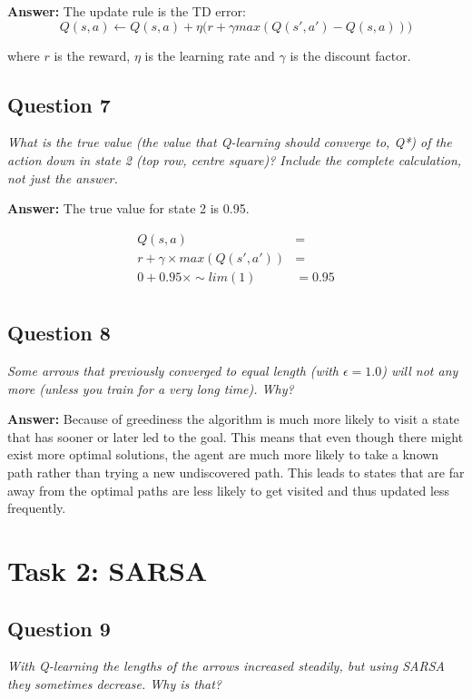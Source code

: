\documentclass[a4paper]{article}
\begin{document}
\textbf{Answer:} 
The update rule is the TD error:
\begin{equation*}
Q(s, a) \leftarrow Q(s, a) + \eta \bigg( r + \gamma max(Q(s', a') - Q(s, a)) \bigg)
\end{equation*}

 where $r$ is the reward, $\eta$ is the learning rate and $\gamma$ is the discount factor.

\subsection*{Question 7}
\emph{What is the true value (the value that Q-learning should converge
to, Q*) of the action down in state 2 (top row, centre square)? Include the complete calculation, not just the answer.}

\textbf{Answer:} The true value for state 2 is 0.95.

\begin{align*}
Q(s, a)                    &= \\
r + \gamma \times max(Q(s', a'))   &= \\
0 + 0.95 \times \sim lim(1) &= 0.95 \\
\end{align*}

\subsection*{Question 8}
\emph{Some arrows that previously converged to equal length (with $\epsilon = 1.0$) will not any more (unless you train for a very long time). Why?}

\textbf{Answer:} Because of greediness the algorithm is much more likely to visit a state that has sooner or later led to the goal. This means that even though there might exist more optimal solutions, the agent are much more likely to take a known path rather than trying a new undiscovered path. 
This leads to states that are far away from the optimal paths are less likely to get visited and thus updated less frequently.

\section{Task 2: SARSA}

\subsection*{Question 9}
\emph{With Q-learning the lengths of the arrows increased steadily, but
using SARSA they sometimes decrease. Why is that?}
\end{document}
